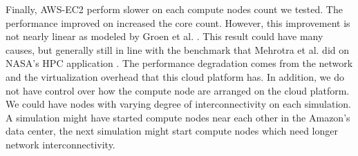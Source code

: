 Finally, AWS-EC2 perform slower on each compute nodes count we tested. The performance improved on increased the core count. However, this improvement is not nearly linear as modeled by Groen et al. \citep{groen2013analysing}. This result could have many causes, but generally still in line with the benchmark that Mehrotra et al. did on NASA's HPC application \citep{mehrotra2012performance}. The performance degradation comes from the network and the virtualization overhead that this cloud platform has. In addition, we do not have control over how the compute node are arranged on the cloud platform. We could have nodes with varying degree of interconnectivity on each simulation. A simulation might have started compute nodes near each other in the Amazon's data center, the next simulation might start compute nodes which need longer network interconnectivity. 

\begin{center}

\label{table:eff}


\end{center}

